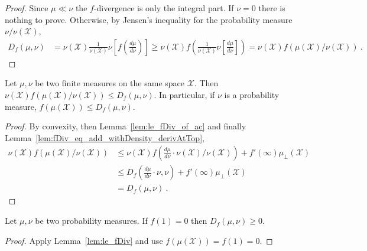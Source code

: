 \begin{proof}\leanok
Since $\mu \ll \nu$ the $f$-divergence is only the integral part. If $\nu = 0$ there is nothing to prove. Otherwise, by Jensen's inequality for the probability measure $\nu / \nu(\mathcal X)$,
\begin{align*}
D_f(\mu, \nu)
&= \nu(\mathcal X) \frac{1}{\nu(\mathcal X)}\nu\left[ f\left( \frac{d\mu}{d\nu} \right) \right]
\ge \nu(\mathcal X) f\left( \frac{1}{\nu(\mathcal X)}\nu\left[\frac{d\mu}{d\nu} \right] \right)
= \nu(\mathcal X) f(\mu(\mathcal X)/\nu(\mathcal X))
\: .
\end{align*}

\end{proof}


\begin{lemma}
  \label{lem:le_fDiv}
  \leanok
  Let $\mu, \nu$ be two finite measures on the same space $\mathcal X$. Then $\nu(\mathcal X) f(\mu(\mathcal X)/\nu(\mathcal X)) \le D_f(\mu, \nu)$. In particular, if $\nu$ is a probability measure, $f(\mu(\mathcal X)) \le D_f(\mu, \nu)$.
\end{lemma}

\begin{proof}\leanok
{}
By convexity, then Lemma~\ref{lem:le_fDiv_of_ac} and finally Lemma~\ref{lem:fDiv_eq_add_withDensity_derivAtTop},
\begin{align*}
\nu(\mathcal X) f(\mu(\mathcal X)/\nu(\mathcal X))
&\le \nu(\mathcal X) f(\frac{d\mu}{d\nu}\cdot \nu (\mathcal X)/\nu(\mathcal X)) + f'(\infty)\mu_{\perp}(\mathcal X)
\\
&\le D_f(\frac{d\mu}{d\nu}\cdot \nu , \nu) + f'(\infty)\mu_{\perp}(\mathcal X)
\\
&= D_f(\mu, \nu)
\: .
\end{align*}
\end{proof}


\begin{lemma}
  \label{lem:fDiv_nonneg}
  \leanok
  Let $\mu, \nu$ be two probability measures. If $f(1) = 0$ then $D_f(\mu, \nu) \ge 0$.
\end{lemma}

\begin{proof}\leanok
{}
Apply Lemma~\ref{lem:le_fDiv} and use $f(\mu(\mathcal X)) = f(1) = 0$.
\end{proof}



